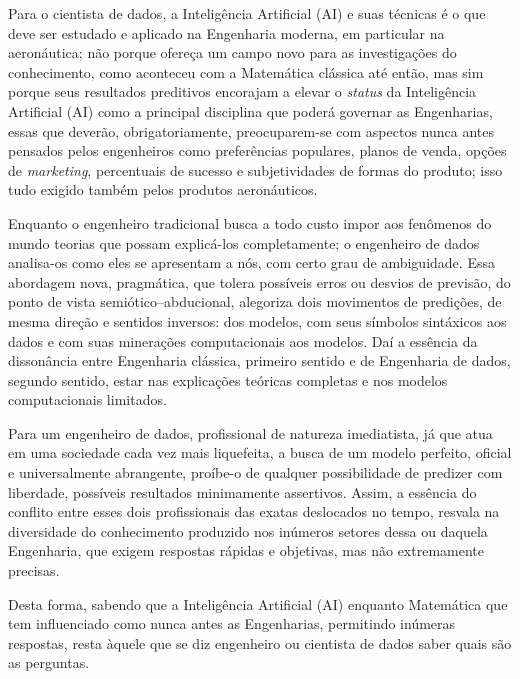 \documentclass[12pt]{article}
\begin{document}
			Para o cientista de dados, a Inteligência Artificial (AI) e suas técnicas é o que deve ser estudado e aplicado na Engenharia moderna, em particular na aeronáutica; não porque ofereça um campo novo para as investigações do conhecimento, como aconteceu com a Matemática clássica até então, mas sim porque seus resultados preditivos encorajam a elevar o \textit{status} da Inteligência Artificial (AI) como a principal disciplina que poderá governar as Engenharias, essas que deverão, obrigatoriamente, preocuparem-se com aspectos nunca antes pensados pelos engenheiros como preferências populares, planos de venda, opções de \textit{marketing}, percentuais de sucesso e subjetividades de formas do produto; isso tudo exigido também pelos produtos aeronáuticos.  
			
			
			Enquanto o engenheiro tradicional busca a todo custo impor aos fenômenos do mundo teorias que possam explicá-los completamente; o engenheiro de dados analisa-os como eles se apresentam a nós, com certo grau de ambiguidade. Essa abordagem nova, pragmática, que tolera possíveis erros ou desvios de previsão, do ponto de vista semiótico–abducional, alegoriza dois movimentos de predições, de mesma direção e sentidos inversos: dos modelos, com seus símbolos sintáxicos aos dados e com suas minerações computacionais aos modelos. Daí a essência da dissonância entre Engenharia clássica, primeiro sentido e de Engenharia de dados, segundo sentido, estar nas explicações teóricas completas e nos modelos computacionais limitados. 
			
			Para um engenheiro de dados, profissional de natureza imediatista, já que atua em uma sociedade cada vez mais liquefeita, a busca de um modelo perfeito, oficial e universalmente abrangente, proíbe-o de qualquer possibilidade de predizer com liberdade, possíveis resultados minimamente assertivos. Assim, a essência do conflito entre esses dois profissionais das exatas deslocados no tempo, resvala na diversidade do conhecimento produzido nos inúmeros setores dessa ou daquela Engenharia, que exigem respostas rápidas e objetivas, mas não extremamente precisas. 
			
			Desta forma, sabendo que a Inteligência Artificial (AI) enquanto Matemática que tem influenciado como nunca antes as Engenharias, permitindo inúmeras respostas, resta àquele que se diz engenheiro ou cientista de dados saber quais são as perguntas. 
			
\end{document}
